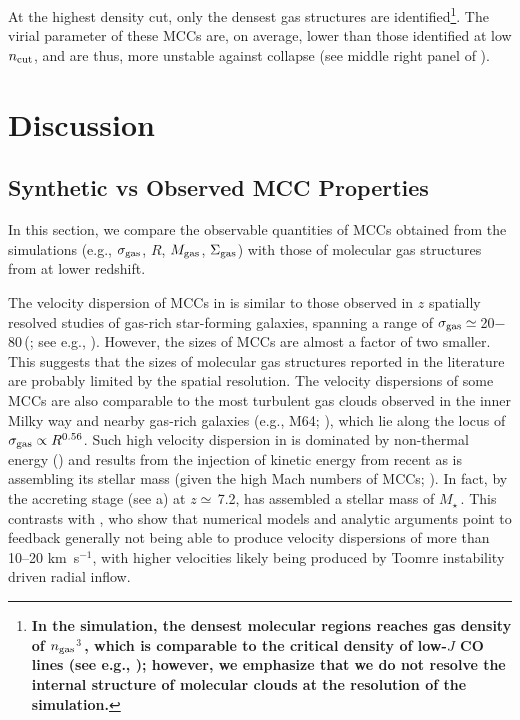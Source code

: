 \IfFileExists{emulateapjlegacy.cls}{\documentclass[iop]{emulateapjlegacy}}{\documentclass[iop]{emulateapj}}
\begin{document}
At the highest density cut, only the densest gas structures are identified\footnote{\bf{In the simulation, the
densest molecular regions reaches gas density of $n_{\rm gas}$$^3$\,\cc, which is comparable to the critical density
of low-$J$ CO lines (see e.g., \citealt{Vallini18a}); however, we emphasize that we do not resolve the internal structure of molecular clouds
at the resolution of the simulation.}}. The virial parameter of these MCCs are, on average, lower than those identified at low $n_{\rm cut}$, and are thus, more unstable against collapse (see middle right panel of ).


\section{Discussion}\label{sec:diss}

\subsection{Synthetic vs Observed MCC Properties} \label{sec:diss1}

In this section, we compare the observable quantities of MCCs obtained from the simulations (e.g., $\sigma_{\rm gas}$, $R$, $M_{\rm gas}$, $\Sigma_{\rm gas}$) with those of molecular gas structures from \obs at lower redshift.

The velocity dispersion of MCCs in \flower is similar to those observed in $z$ spatially resolved studies of gas-rich star-forming galaxies,
spanning a range of $\sigma_{\rm gas}\simeq$\,20$-$80\,\kms (; see e.g., \citealt{Swinbank11a}).
However, the sizes of MCCs are almost a factor of two smaller. This suggests that the sizes of \highz molecular gas structures reported in the literature
are probably limited by the spatial resolution.
The velocity dispersions of some MCCs are also comparable to the most turbulent gas clouds observed in the inner Milky way and nearby gas-rich galaxies (e.g., M64; \citealt{Oka01a, Rosolowsky05a, Heyer09a, Leroy15a}), which lie along the locus of $\sigma_{\rm gas}\propto R^{0.56}$. Such high velocity dispersion in \flower is dominated by non-thermal energy () and results from the injection of kinetic energy from recent \SF as \flower is assembling its stellar mass (given the high Mach numbers of MCCs; ). In fact, by the accreting stage (see a) at $z\simeq$\,7.2, \flower has assembled a stellar mass of $M_\star$\,\Msun.
%
This contrasts with \citet{Krumholz18a}, who show that numerical models and analytic arguments point to feedback generally not being able to produce velocity dispersions of more than 10--20 km~s$^{-1}$, with higher velocities likely being produced by Toomre instability driven radial inflow.
\end{document}

